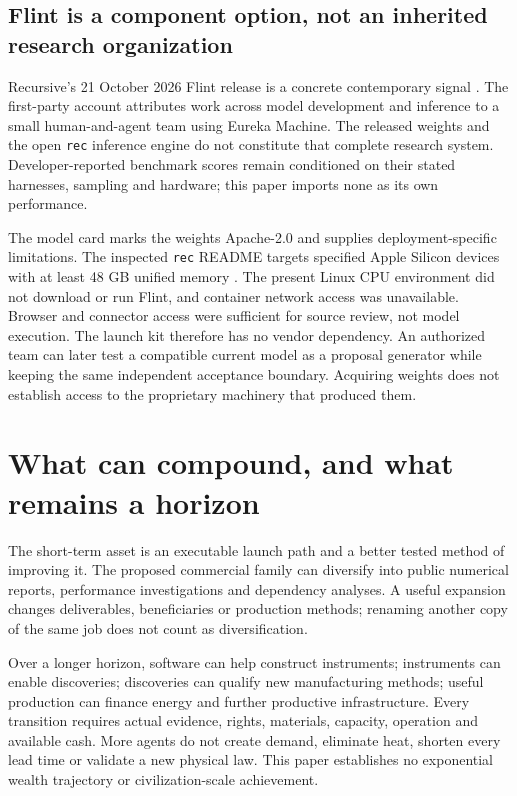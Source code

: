 \documentclass[11pt,letterpaper]{article}
\begin{document}
\subsection{Flint is a component option, not an inherited research organization}
Recursive's 21 October 2026 Flint release is a concrete contemporary signal \cite{flint,flintcard,flintcommit}. The first-party account attributes work across model development and inference to a small human-and-agent team using Eureka Machine. The released weights and the open \texttt{rec} inference engine do not constitute that complete research system. Developer-reported benchmark scores remain conditioned on their stated harnesses, sampling and hardware; this paper imports none as its own performance.

The model card marks the weights Apache-2.0 and supplies deployment-specific limitations. The inspected \texttt{rec} README targets specified Apple Silicon devices with at least 48 GB unified memory \cite{rec}. The present Linux CPU environment did not download or run Flint, and container network access was unavailable. Browser and connector access were sufficient for source review, not model execution. The launch kit therefore has no vendor dependency. An authorized team can later test a compatible current model as a proposal generator while keeping the same independent acceptance boundary. Acquiring weights does not establish access to the proprietary machinery that produced them.

\section{What can compound, and what remains a horizon}
The short-term asset is an executable launch path and a better tested method of improving it. The proposed commercial family can diversify into public numerical reports, performance investigations and dependency analyses. A useful expansion changes deliverables, beneficiaries or production methods; renaming another copy of the same job does not count as diversification.

Over a longer horizon, software can help construct instruments; instruments can enable discoveries; discoveries can qualify new manufacturing methods; useful production can finance energy and further productive infrastructure. Every transition requires actual evidence, rights, materials, capacity, operation and available cash. More agents do not create demand, eliminate heat, shorten every lead time or validate a new physical law. This paper establishes no exponential wealth trajectory or civilization-scale achievement.
\end{document}
